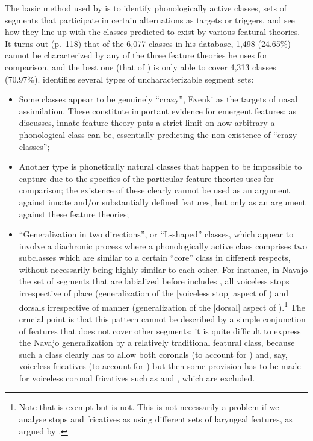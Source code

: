 The basic method used by \citet{mielke-diss} is to identify phonologically active classes, \ie sets of segments that participate in certain alternations as targets or triggers, and see how they line up with the classes predicted to exist by various featural theories. It turns out (p.~118) that of the 6,077 classes in his database, 1,498 (24.65\%) cannot be characterized by any of the three feature theories he uses for comparison, and the best one (that of \citealt{spe}) is only able to cover 4,313 classes (70.97\%). \citet{mielke-diss} identifies several types of uncharacterizable segment sets:
\begin{itemize}
\item Some classes appear to be genuinely \enquote{crazy}, \eg Evenki  as the targets of nasal assimilation. These constitute important evidence for emergent features: as \citet[§6.1]{mielke-diss} discusses, innate feature theory puts a strict limit on how arbitrary a phonological class can be, essentially predicting the non\hyp existence of \enquote{crazy classes};
\item Another type is phonetically natural classes that happen to be impossible to capture due to the specifics of the particular feature theories \citet{mielke-diss} uses for comparison; the existence of these clearly cannot be used as an argument against innate and\fshyp or substantially defined features, but only as an argument against these feature theories;
\item \enquote{Generalization in two directions}, or \enquote{L-shaped} classes, which appear to involve a diachronic process where a phonologically active class comprises two subclasses which are similar to a certain \enquote{core} class in different respects, without necessarily being highly similar to each other. For instance, in Navajo the set of segments that are labialized before \ipa{[o]} includes \ipa{[t~k~kʼ~x~ɣ]}, \ie all voiceless stops irrespective of place (generalization of the [voiceless stop] aspect of \ipa{[k]}) and dorsals irrespective of manner (generalization of the [dorsal] aspect of \ipa{[k]}).\footnote{Note that \ipa{[ɡ]} is exempt but \ipa{[ɣ]} is not. This is not necessarily a problem if we analyse stops and fricatives as using different sets of laryngeal features, as argued by \citet{rice94:_laryn_athap}.} The crucial point is that this pattern cannot be described by a simple conjunction of features that does not cover other segments: it is quite difficult to express the Navajo generalization by a relatively traditional featural class, because such a class clearly has to allow both coronals (to account for \ipa{[t]}) and, say, voiceless fricatives (to account for \ipa{[x]}) but then some provision has to be made for voiceless coronal fricatives such as \ipa{[s]} and \ipa{[ɬ]}, which are excluded.
\end{itemize}


